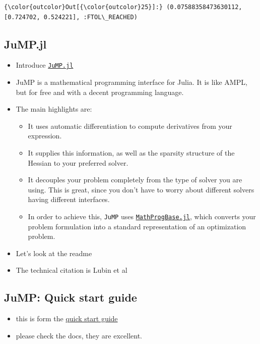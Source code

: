 \documentclass[11pt]{article}
\providecommand{\tightlist}{%
      \setlength{\itemsep}{0pt}\setlength{\parskip}{0pt}}
\begin{document}
\begin{Verbatim}[commandchars=\\\{\}]
{\color{outcolor}Out[{\color{outcolor}25}]:} (0.07588358473630112, [0.724702, 0.524221], :FTOL\_REACHED)
\end{Verbatim}
            
    \subsection{JuMP.jl}\label{jump.jl}

\begin{itemize}
\tightlist
\item
  Introduce \href{https://github.com/JuliaOpt/JuMP.jl}{\texttt{JuMP.jl}}
\item
  JuMP is a mathematical programming interface for Julia. It is like
  AMPL, but for free and with a decent programming language.
\item
  The main highlights are:

  \begin{itemize}
  \tightlist
  \item
    It uses automatic differentiation to compute derivatives from your
    expression.
  \item
    It supplies this information, as well as the sparsity structure of
    the Hessian to your preferred solver.
  \item
    It decouples your problem completely from the type of solver you are
    using. This is great, since you don't have to worry about different
    solvers having different interfaces.
  \item
    In order to achieve this, \texttt{JuMP} uses
    \href{https://github.com/JuliaOpt/MathProgBase.jl}{\texttt{MathProgBase.jl}},
    which converts your problem formulation into a standard
    representation of an optimization problem.
  \end{itemize}
\item
  Let's look at the readme
\item
  The technical citation is Lubin et al \cite{JuMP}
\end{itemize}

    \subsection{JuMP: Quick start guide}\label{jump-quick-start-guide}

\begin{itemize}
\tightlist
\item
  this is form the
  \href{http://www.juliaopt.org/JuMP.jl/0.16/quickstart.html}{quick
  start guide}
\item
  please check the docs, they are excellent.
\end{itemize}
\end{document}
